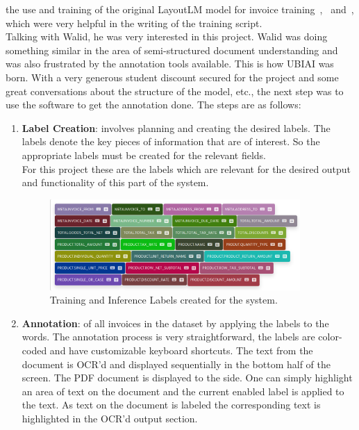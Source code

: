 the use and training of the original LayoutLM model for invoice training~\autocite{EasyUseTexta},~\autocite{EasyUseTextb}
and~\autocite{amamouFineTuningLayoutLMV22022}, which were very helpful in the writing of the training script.\\
Talking with Walid, he was very interested in this project. Walid was doing something similar in the area of semi-structured
document understanding and was also frustrated by the annotation tools available. This is how UBIAI was born. With a very generous
student discount secured for the project and some great conversations about the structure of the model, etc., the
next step was to use the software to get the annotation done.
\bigbreak
The steps are as follows:
\begin{enumerate}
	\item \textbf{Label Creation}: involves planning and creating the desired labels. The labels denote the key pieces of information
	      that are of interest. So the appropriate labels must be created for the relevant fields.\\
	      For this project these are the labels which are relevant for the desired output and functionality of this part of the system.
	      \begin{figure}[H]
		      \centering
		      \includegraphics[width=0.9\textwidth]{figures/training_labels.png}
		      \caption{Training and Inference Labels created for the system.}
		      \label{fig:training_labels}
	      \end{figure}
		  \newpage
	\item \textbf{Annotation}: of all invoices in the dataset by applying the labels to the words. The annotation process is
	      very straightforward, the labels are color-coded and have customizable keyboard shortcuts. The text from the document
	      is OCR'd and displayed sequentially in the bottom half of the screen. The PDF document is displayed to the side.
	      One can simply highlight an area of text on the document and the current enabled label is applied to the text.
	      As text on the document is labeled the corresponding text is highlighted in the OCR'd output section.

\end{enumerate}
